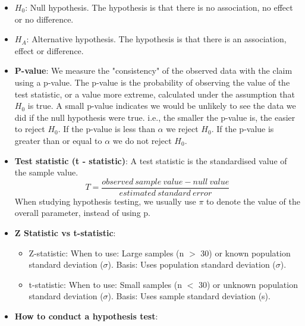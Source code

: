 \documentclass[12pt]{book}
\begin{document}

\newpage

\pagestyle{fancy}

\begin{itemize}
\item \textbf{$H_0$}: Null hypothesis. The hypothesis is that there is no association, no effect or no difference.
\item \textbf{$H_A$}: Alternative hypothesis. The hypothesis is that there is an association, effect or difference.
\item \textbf{P-value}: We measure the "consistency" of the observed data with the claim using a p-value. The p-value is the probability of observing the value of the test statistic, or a value more extreme, calculated under the assumption that $H_0$ is true. A small p-value indicates we would be unlikely to see the data we did if the null hypothesis were true. i.e., the smaller the p-value is, the easier to reject $H_0$. If the p-value is less than $\alpha$ we reject $H_0$. If the p-value is greater than or equal to $\alpha$ we do not reject $H_0$.
\item \textbf{Test statistic (t - statistic)}: A test statistic is the standardised value of the sample value. 
$$T = \frac{observed \ sample \ value - null \ value}{estimated \ standard \ error}$$
When studying hypothesis testing, we usually use $\pi$ to denote the value of the overall parameter, instead of using p.
\item \textbf{Z Statistic vs t-statistic}:
\begin{itemize}
\item Z-statistic: When to use: Large samples (n $>$ 30) or known population standard deviation ($\sigma$). Basis: Uses population standard deviation ($\sigma$).
\item t-statistic: When to use: Small samples (n $<$ 30) or unknown population standard deviation ($\sigma$). Basis: Uses sample standard deviation (s).
\end{itemize}
\item \textbf{How to conduct a hypothesis test}:

\end{itemize}
\end{document}
